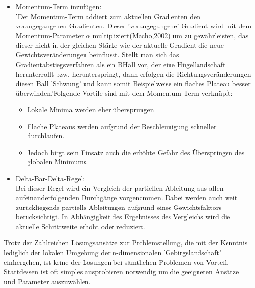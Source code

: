 \begin{itemize}
  \item Momentum-Term inzufügen:\\
  'Der Momentum-Term addiert zum aktuellen Gradienten den vorangegangenen Gradienten. Dieser 'vorangegangene' Gradient wird mit dem Momentum-Parameter $\alpha$ multipliziert(Macho,2002) um zu gewährleisten, das dieser nicht
  in der gleichen Stärke wie der aktuelle Gradient die neue Gewichtsveränderungen beinflusst. Stellt man sich das Gradientabstiegsverfahren als ein BHall vor, der eine Hügellandschaft herunterrollt
  bzw. herunterspringt, dann erfolgen die Richtungsveränderungen diesen Ball 'Schwung' und kann somit Beispielweise ein flaches Plateau besser überwinden.'Folgende Vortile sind mit dem Momentum-Term verknüpft:\\
  \begin{itemize}
  \item Lokale Minima werden eher übersprungen
  \item Flache Plateaus werden aufgrund der Beschleunigung schneller durchlaufen.
  \item Jedoch birgt sein Einsatz auch die erhöhte Gefahr des Überspringen des globalen Minimums.
  \end{itemize}
\end{itemize}
\begin{itemize}
  \item  Delta-Bar-Delta-Regel:\\
  Bei dieser Regel wird ein Vergleich der partiellen Ableitung aus allen aufeinanderfolgenden Durchgänge vorgenommen. Dabei werden auch weit zurückliegende partielle Ableitungen aufgrund eines Gewichtsfaktors 
  berücksichtigt. In Abhängigkeit des Ergebnisses des Vergleichs wird die aktuelle Schrittweite erhöht oder reduziert.\\
\end{itemize}
Trotz der Zahlreichen Lösungsansätze zur Problemstellung, die mit der Kenntnis lediglich der lokalen Umgebung der n-dimensionalen 'Gebirgslandschaft' einhergehen, ist keine der Lösungen bei sämtlichen Problemen 
von Vorteil. Stattdessen ist oft simples ausprobieren notwendig um die geeigneten Ansätze und Parameter auszuwählen\cite[Seite 48]{GR10}.



